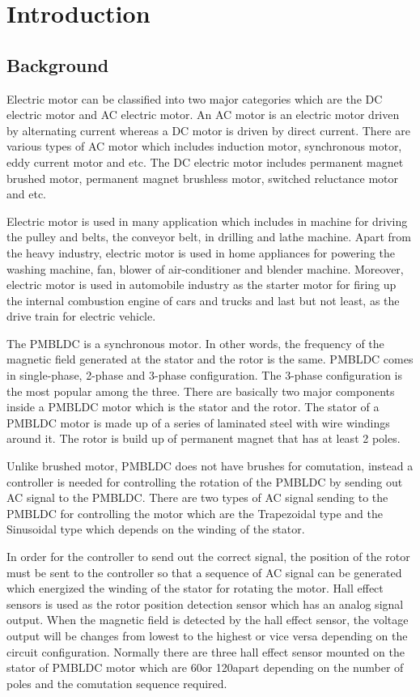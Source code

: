 \chapter{Introduction}\label{chap:intro}
\section{Background}

Electric motor can be classified into two major categories which are the DC electric motor and AC electric motor. An AC motor is an electric motor driven by alternating current whereas a DC motor is driven by direct current. There are various types of AC motor which includes induction motor, synchronous motor, eddy current motor and etc. The DC electric motor includes permanent magnet brushed motor, permanent magnet brushless motor, switched reluctance motor and etc.

Electric motor is used in many application which includes in machine for driving the pulley and belts, the conveyor belt, in drilling and lathe machine. Apart from the heavy industry, electric motor is used in home appliances for powering the washing machine, fan, blower of air-conditioner and blender machine. Moreover, electric motor is used in automobile industry as the starter motor for firing up the internal combustion engine of cars and trucks and last but not least, as the drive train for electric vehicle.

The PMBLDC is a synchronous motor. In other words, the frequency of the magnetic field generated at the stator and the rotor is the same. PMBLDC comes in single-phase, 2-phase and 3-phase configuration. The 3-phase configuration is the most popular among the three. There are basically two major components inside a PMBLDC motor which is the stator and the rotor. The stator of a PMBLDC motor is made up of 
a series of laminated steel with wire windings around it. The rotor is build up of permanent magnet that has at least 2 poles.

Unlike brushed motor, PMBLDC does not have brushes for comutation, instead a controller is needed for controlling the rotation of the PMBLDC by sending out AC signal to the PMBLDC. There are two types of AC signal sending to the PMBLDC for controlling the motor which are the Trapezoidal type and the Sinusoidal type which depends on the winding of the stator.

In order for the controller to send out the correct signal, the position of the rotor must be sent to the controller so that a sequence of AC signal can be generated which energized the winding of the stator for rotating the motor. Hall effect sensors is used as the rotor position detection sensor which has an analog signal output. When the magnetic field is detected by the hall effect sensor, the voltage output will be changes from lowest to the highest or vice versa depending on the circuit configuration. Normally there are three hall effect sensor mounted on the stator of PMBLDC motor which are 60\textdegree or 120\textdegree apart depending on the number of poles and the comutation sequence required.

